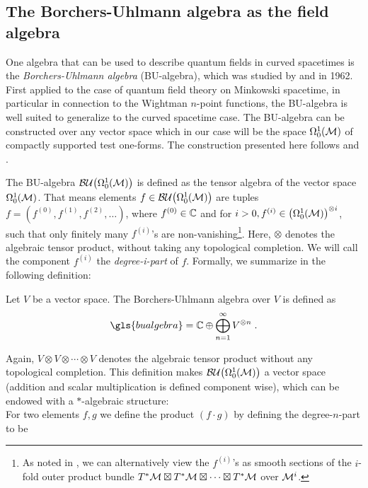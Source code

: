 \subsection{The Borchers-Uhlmann algebra as the field algebra}\label{sec:BU-algebra}
One algebra that can be used to describe quantum fields in curved spacetimes is the \emph{Borchers-Uhlmann algebra} (BU-algebra), which was studied by  \cite{borchers} and
 \cite{uhlmann} in 1962. First applied to the case of quantum field theory on Minkowski spacetime, in particular in connection to the Wightman $n$-point functions, the BU-algebra is well suited to generalize to the curved spacetime case. The BU-algebra can be constructed over any vector space which in our case will be the space $\Omega^1_0(\mathcal{M})$ of compactly supported test one-forms. The construction presented here follows \cite[Chapter 4.1]{verch_sahlman} and \cite[Chapter 8.3.2]{haag}.\par
The BU-algebra ${\mathcal{BU}\big(\Omega^1_0(\mathcal{M})\big)}$ is defined as the tensor algebra of the vector space $\Omega^1_0(\mathcal{M})$. That means elements $f \in {\mathcal{BU}\big(\Omega^1_0(\ensuremath{\mathcal{M}})\big)}$ are tuples $f= (f^{(0)}, f^{(1)}, f^{(2)}, \dots)$, where $f^{(0)} \in \mathbb{C}$ and for $i>0, f^{(i)} \in \big(\Omega^1_0(\mathcal{M})\big)^{\otimes i}$, such that only finitely many $f^{(i)}$'s are non-vanishing\footnote{As noted in \cite[Chapter 3.3]{verch_sahlman}, we can alternatively view the $f^{(i)}$'s as smooth sections of the $i$-fold outer product bundle $T^*\mathcal{M} \boxtimes T^*\mathcal{M} \boxtimes \cdots \boxtimes T^*\mathcal{M}$ over $\mathcal{M} ^i$.}. Here, $\otimes$ denotes the algebraic tensor product, without taking any topological completion. We will call the component $f^{(i)}$ the \emph{degree-i-part} of $f$.\newpage
Formally, we summarize in the following definition:
\begin{definition}
Let $V$ be a vector space. The Borchers-Uhlmann algebra over $V$ is defined as
\begin{align}
	\gls{bualgebra} = \IC \oplus \bigoplus\limits_{n= 1}^\infty V^{\otimes n} \formspace.
\end{align}
\end{definition}
%
\noindent
Again, $V \otimes V \otimes \cdots \otimes V$ denotes the algebraic tensor product without any topological completion.
This definition makes ${\mathcal{BU}\big(\Omega^1_0(\mathcal{M})\big)}$ a vector space (addition and scalar multiplication is defined component wise), which can be endowed with a $*$-algebraic structure: \\
For two elements $f, g$ we define the product $(f\cdot g)$ by defining the degree-$n$-part to be
